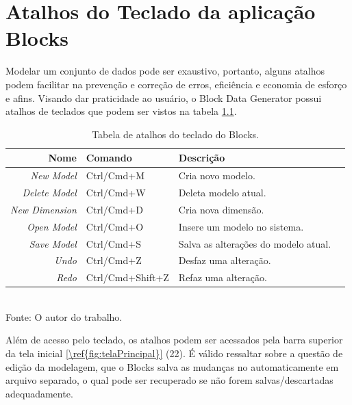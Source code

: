 \documentclass[
	12pt,				%
	openright,			%
	oneside,			%
	a4paper,			%
	english,			%
	brazil				%
	]{abntex2}
\begin{document}
\chapter{Atalhos do Teclado da aplicação Blocks}
Modelar um conjunto de dados pode ser exaustivo, portanto, alguns atalhos podem facilitar na prevenção e correção de erros, eficiência e economia de esforço e afins.
Visando dar praticidade ao usuário, o Block Data Generator possui atalhos de teclados que podem ser vistos na tabela \ref{table: comandos do teclado}.
	\begin{table}[h]
		\centering
		\caption{Tabela de atalhos do teclado do Blocks.}
		\vspace{0.5cm}
		\label{table: comandos do teclado}
		\begin{tabular}{r|lll}
		
			Nome                 & Comando          & Descrição                           \\ %
			\hline                                  %
			\emph{New Model}     & Ctrl/Cmd+M       & Cria novo modelo.                   \\
			\emph{Delete Model}  & Ctrl/Cmd+W       & Deleta modelo atual.                \\
			\emph{New Dimension} & Ctrl/Cmd+D       & Cria nova dimensão.                 \\
			\emph{Open Model}    & Ctrl/Cmd+O       & Insere um modelo no sistema.        \\
			\emph{Save Model}    & Ctrl/Cmd+S       & Salva as alterações do modelo atual.\\
			\emph{Undo}          & Ctrl/Cmd+Z       & Desfaz uma alteração.               \\
			\emph{Redo}          & Ctrl/Cmd+Shift+Z & Refaz uma alteração.                \\

		\end{tabular}
		\bigskip
		\\
		\footnotesize Fonte: O autor do trabalho.
	\end{table}
\par

Além de acesso pelo teclado, os atalhos podem ser acessados pela barra superior da tela inicial \ref{\ref{fig:telaPrincipal}} (22).
É válido ressaltar sobre a questão de edição da modelagem, que o Blocks salva as mudanças no automaticamente em arquivo separado, o qual pode ser recuperado se não forem salvas/descartadas adequadamente.
\end{document}
